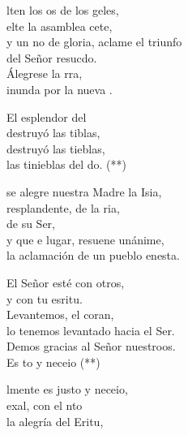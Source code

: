 \begin{cancion}%
	lten los os de los geles,\\
	elte la asamblea cete,\\
	y un no de gloria, aclame el triunfo\\
	del Señor resucdo.\\
	Álegrese la rra,\\
	inunda por la nueva .\jump\\
	\begin{chorus}%
		El esplendor del  \\
		destruyó las tiblas,\\
		destruyó las tieblas,\\
		las tinieblas del do. (**)\jump\\
	\end{chorus}%
	 se alegre nuestra Madre la Isia,\\
	resplandente, de la ria,\\
	de su Ser,\\
	y que e lugar, resuene unánime,\\
	la aclamación de un pueblo enesta.\jump\\
	\begin{chorus}%
		El Señor esté con otros,\\
		y con tu esritu.\\
		Levantemos, el cora\chord{Mi}{7}{zó}n,\\
		lo tenemos levantado hacia el Se\chord{Mi}{7}{ño}r.\\
		Demos gracias al Señor nuestroos.\\
	\jump
		Es to y neceio (**)\jump\\
	\end{chorus}%
	lmente es justo y neceio,\\
	exal, con el nto \\
	la alegría del Eritu,\\

\end{cancion}
